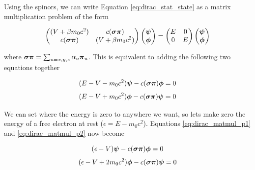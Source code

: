 \documentclass[12pt]{report}
\begin{document}
Using the spinors, we can write Equation \ref{eq:dirac_stat_state} as a matrix multiplication problem of the form

\begin{equation}
\label{eq:dirac_stat_state_matmul}
\begin{pmatrix}
(V + \beta m_{0}c^{2})	&	c({\bf{\sigma\pi}})		\\
c({\bf{\sigma\pi}})		&	(V + \beta m_{0}c^{2})	\\
\end{pmatrix}
\begin{pmatrix}
{\bf{\psi}}	\\
{\bf{\phi}}	\\
\end{pmatrix}
=
\begin{pmatrix}
E	&	0	\\
0	&	E	\\
\end{pmatrix}
\begin{pmatrix}
{\bf{\psi}}	\\
{\bf{\phi}}	\\
\end{pmatrix}
\end{equation}

where ${\bf{\sigma\pi}} =\sum_{u=x,y,z}\alpha_{u}{\bf{\pi}}_{u}$. This is equivalent to adding the following two equations together

\begin{equation}
\label{eq:dirac_matmul_p1}
(E - V - m_{0}c^{2}){\bf{\psi}} - c({\bf{\sigma\pi}}){\bf{\phi}} = 0
\end{equation}
\begin{equation}
\label{eq:dirac_matmul_p2}
(E - V + m_{0}c^{2}){\bf{\phi}} - c({\bf{\sigma\pi}}){\bf{\psi}} = 0
\end{equation}

We can set where the energy is zero to anywhere we want, so lets make zero the energy of a free electron at rest ($\epsilon = E - m_{0}c^{2}$). Equations \ref{eq:dirac_matmul_p1} and \ref{eq:dirac_matmul_p2} now become

\begin{equation}
\label{eq:dirac_matmul_p3}
(\epsilon - V){\bf{\psi}} - c({\bf{\sigma\pi}}){\bf{\phi}} = 0
\end{equation}
\begin{equation}
\label{eq:dirac_matmul_p4}
(\epsilon - V + 2m_{0}c^{2}){\bf{\phi}} - c({\bf{\sigma\pi}}){\bf{\psi}} = 0
\end{equation}
\end{document}
